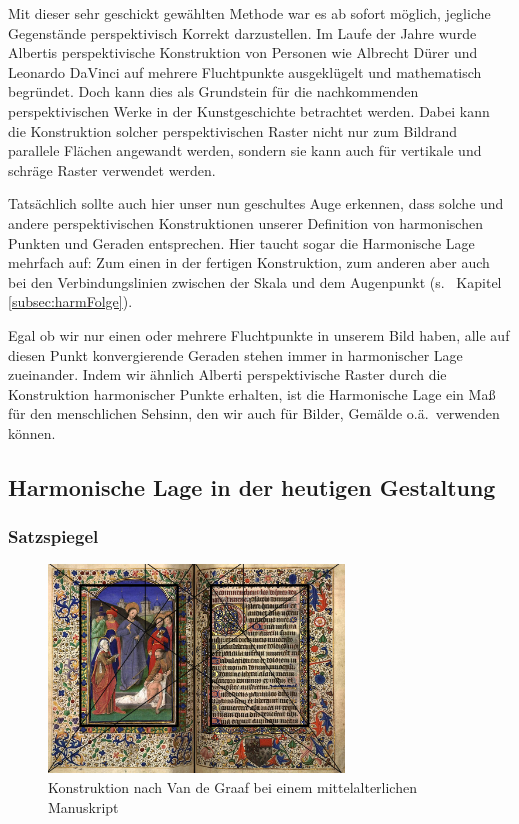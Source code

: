 \documentclass[12pt,a4paper]{article}
\begin{document}
Mit dieser sehr geschickt gewählten Methode war es ab sofort möglich, jegliche Gegenstände perspektivisch Korrekt darzustellen. Im Laufe der Jahre wurde Albertis perspektivische Konstruktion von Personen wie Albrecht Dürer und Leonardo DaVinci auf mehrere Fluchtpunkte ausgeklügelt und mathematisch begründet. Doch kann dies als Grundstein für die nachkommenden perspektivischen Werke in der Kunstgeschichte betrachtet werden. Dabei kann die Konstruktion solcher perspektivischen Raster nicht nur zum Bildrand parallele Flächen angewandt werden, sondern sie kann auch für vertikale und schräge Raster verwendet werden.


Tatsächlich sollte auch hier unser nun geschultes Auge erkennen, dass solche und andere perspektivischen Konstruktionen unserer Definition von harmonischen Punkten und Geraden entsprechen. Hier taucht sogar die Harmonische Lage mehrfach auf: Zum einen in der fertigen Konstruktion, zum anderen aber auch bei den Verbindungslinien zwischen der Skala und dem Augenpunkt (s.~ Kapitel \ref{subsec:harmFolge}).

Egal ob wir nur einen oder mehrere Fluchtpunkte in unserem Bild haben, alle auf diesen Punkt konvergierende Geraden stehen immer in harmonischer Lage zueinander. Indem wir ähnlich Alberti perspektivische Raster durch die Konstruktion harmonischer Punkte erhalten, ist die Harmonische Lage ein Maß für den menschlichen Sehsinn, den wir auch für Bilder, Gemälde o.ä.~verwenden können.

\newpage
\subsection{Harmonische Lage in der heutigen Gestaltung}

\subsubsection{Satzspiegel}

\begin{figure}[htbp]
\centering
\includegraphics[width=0.7\textwidth]{Bilder/oldManus.jpg}
\caption{Konstruktion nach Van de Graaf bei einem mittelalterlichen Manuskript}
\label{fig:oldMan}
\end{figure}
\end{document}
